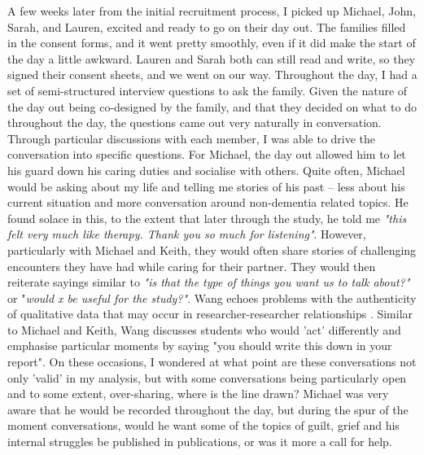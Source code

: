 A few weeks later from the initial recruitment process, I picked up Michael, John, Sarah, and Lauren, excited and ready to go on their day out. The families filled in the consent forms, and it went pretty smoothly, even if it did make the start of the day a little awkward. Lauren and Sarah both can still read and write, so they signed their consent sheets, and we went on our way. Throughout the day, I had a set of semi-structured interview questions to ask the family. Given the nature of the day out being co-designed by the family, and that they decided on what to do throughout the day, the questions came out very naturally in conversation. Through particular discussions with each member, I was able to drive the conversation into specific questions.  For Michael, the day out allowed him to let his guard down his caring duties and socialise with others. Quite often, Michael would be asking about my life and telling me stories of his past – less about his current situation and more conversation around non-dementia related topics. He found solace in this, to the extent that later through the study, he told me \textit{"this felt very much like therapy. Thank you so much for listening"}. However, particularly with Michael and Keith, they would often share stories of challenging encounters they have had while caring for their partner. They would then reiterate sayings similar to \textit{"is that the type of things you want us to talk about?"} or "\textit{would x be useful for the study?"}. Wang echoes problems with the authenticity of qualitative data that may occur in researcher-researcher relationships \citep{wang_construction_2013}. Similar to Michael and Keith, Wang discusses students who would 'act' differently and emphasise particular moments by saying "you should write this down in your report". On these occasions, I wondered at what point are these conversations not only 'valid' in my analysis, but with some conversations being particularly open and to some extent, over-sharing, where is the line drawn? Michael was very aware that he would be recorded throughout the day, but during the spur of the moment conversations, would he want some of the topics of guilt, grief and his internal struggles be published in publications, or was it more a call for help.

